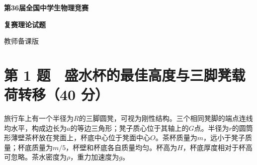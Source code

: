 \documentclass[12pt,a4paper,fontset=fandol]{ctexart}
\begin{document}
\begin{titlepage}
\thispagestyle{empty}
\vspace*{27mm}
\begin{center}
{\LARGE\bfseries 第36届全国中学生物理竞赛\par}
\vspace{8mm}
{\LARGE\bfseries 复赛理论试题\par}
\vspace{17mm}
{\Large 教师备课版\par}
\end{center}
\vfill
\end{titlepage}
\setcounter{page}{1}
\section{第 1 题　盛水杯的最佳高度与三脚凳载荷转移（40
分）}\label{ux7b2c-1-ux9898-ux76dbux6c34ux676fux7684ux6700ux4f73ux9ad8ux5ea6ux4e0eux4e09ux811aux51f3ux8f7dux8377ux8f6cux79fb40-ux5206}

旅行车上有一个半径为\(R\)的三脚圆凳，可视为刚性结构。三个相同凳脚的端点连线均水平，构成边长为\(a\)的等边三角形；凳子质心位于其轴上的\(G\)点。半径为\(r\)的圆筒形薄壁茶杯放在凳面上，杯底中心位于凳面中心\(O\)。茶杯质量为\(m\)，远小于凳子质量；杯底质量为\(m/5\)，杯壁和杯底各自质量均匀。杯高为\(H\)，杯底厚度相对于杯高可忽略。茶水密度为\(\rho\)，重力加速度为\(g\)。
\end{document}
